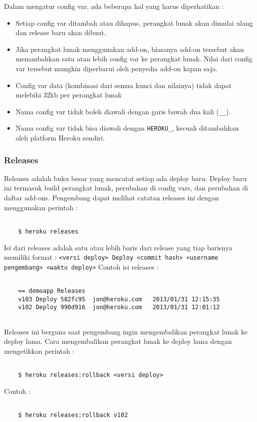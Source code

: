 Dalam mengatur config var, ada beberapa hal yang harus diperhatikan :
\begin{itemize}
\item Setiap config var ditambah atau dihapus, perangkat lunak akan dimulai ulang dan release baru akan dibuat.
\item Jika perangkat lunak menggunakan add-on, biasanya add-on tersebut akan menambahkan satu atau lebih config var ke perangkat lunak. Nilai dari config var tersebut mungkin diperbarui oleh penyedia add-on kapan saja.
\item Config var data (kombinasi dari semua kunci dan nilainya) tidak dapat melebihi 32kb per perangkat lunak
\item Nama config var tidak boleh diawali dengan garis bawah dua kali (\texttt{\_\_}).
\item Nama config var tidak bisa diawali dengan \texttt{HEROKU\_}, kecuali ditambahkan oleh platform Heroku sendiri.
\end{itemize}

\subsubsection{Releases}
Releases adalah buku besar yang mencatat setiap ada deploy baru. Deploy baru ini termasuk build perangkat lunak, perubahan di config vars, dan perubahan di daftar add-ons. Pengembang dapat melihat catatan releases ini dengan menggunakan perintah :
\begin{lstlisting}

	$ heroku releases

\end{lstlisting}
Isi dari releases adalah satu atau lebih baris dari release yang tiap barisnya memiliki format : \texttt{<versi deploy> Deploy <commit hash> <username pengembang> <waktu deploy>} Contoh isi releases :
\begin{lstlisting}

	== demoapp Releases
	v103 Deploy 582fc95  jon@heroku.com   2013/01/31 12:15:35
	v102 Deploy 990d916  jon@heroku.com   2013/01/31 12:01:12
	
\end{lstlisting}

Releases ini berguna saat pengembang ingin mengembalikan perangkat lunak ke deploy lama. Cara mengembalikan perangkat lunak ke deploy lama dengan mengetikkan perintah :
\begin{lstlisting}

	$ heroku releases:rollback <versi deploy>

\end{lstlisting}
Contoh :
\begin{lstlisting}

	$ heroku releases:rollback v102

\end{lstlisting}


